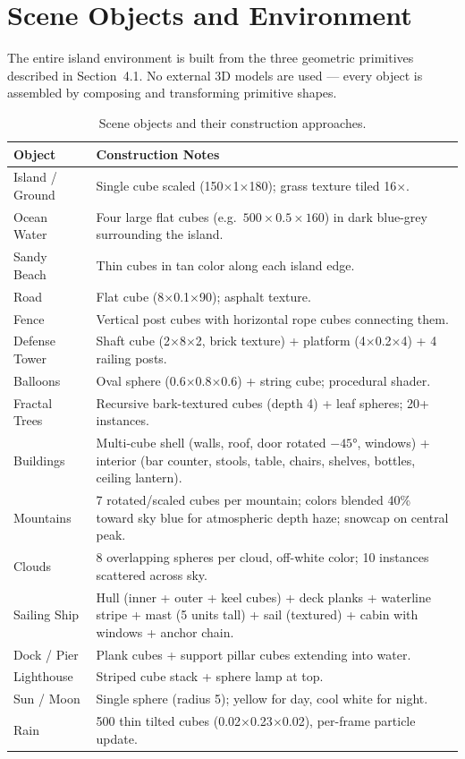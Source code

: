 \documentclass[12pt,a4paper]{article}
\begin{document}
\section{Scene Objects and Environment}

The entire island environment is built from the three geometric primitives described in Section~4.1. No external 3D models are used --- every object is assembled by composing and transforming primitive shapes.

\begin{table}[h!]
\centering
\renewcommand{\arraystretch}{1.2}
\begin{tabular}{@{} p{3.5cm} p{9cm} @{}}
\toprule
\textbf{Object} & \textbf{Construction Notes} \\
\midrule
Island / Ground  & Single cube scaled (150$\times$1$\times$180); grass texture tiled 16$\times$. \\
Ocean Water      & Four large flat cubes (e.g.\ $500\times0.5\times160$) in dark blue-grey surrounding the island. \\
Sandy Beach      & Thin cubes in tan color along each island edge. \\
Road             & Flat cube (8$\times$0.1$\times$90); asphalt texture. \\
Fence            & Vertical post cubes with horizontal rope cubes connecting them. \\
Defense Tower    & Shaft cube (2$\times$8$\times$2, brick texture) + platform (4$\times$0.2$\times$4) + 4 railing posts. \\
Balloons         & Oval sphere (0.6$\times$0.8$\times$0.6) + string cube; procedural shader. \\
Fractal Trees    & Recursive bark-textured cubes (depth 4) + leaf spheres; 20+ instances. \\
Buildings        & Multi-cube shell (walls, roof, door rotated $-45°$, windows) + interior (bar counter, stools, table, chairs, shelves, bottles, ceiling lantern). \\
Mountains        & 7 rotated/scaled cubes per mountain; colors blended 40\% toward sky blue for atmospheric depth haze; snowcap on central peak. \\
Clouds           & 8 overlapping spheres per cloud, off-white color; 10 instances scattered across sky. \\
Sailing Ship     & Hull (inner + outer + keel cubes) + deck planks + waterline stripe + mast (5 units tall) + sail (textured) + cabin with windows + anchor chain. \\
Dock / Pier      & Plank cubes + support pillar cubes extending into water. \\
Lighthouse       & Striped cube stack + sphere lamp at top. \\
Sun / Moon       & Single sphere (radius 5); yellow for day, cool white for night. \\
Rain             & 500 thin tilted cubes (0.02$\times$0.23$\times$0.02), per-frame particle update. \\
\bottomrule
\end{tabular}
\caption{Scene objects and their construction approaches.}
\end{table}
\end{document}
